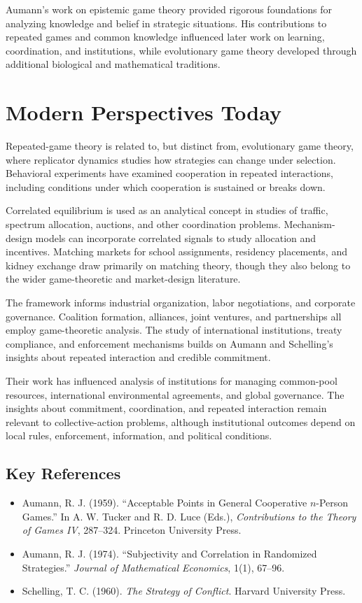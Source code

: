 Aumann's work on epistemic game theory provided rigorous foundations for
analyzing knowledge and belief in strategic situations. His contributions to
repeated games and common knowledge influenced later work on learning,
coordination, and institutions, while evolutionary game theory developed through
additional biological and mathematical traditions.

\section{Modern Perspectives Today}
Repeated-game theory is related to, but distinct from, evolutionary game theory,
where replicator dynamics studies how strategies can change under selection.
Behavioral experiments have examined cooperation in repeated interactions,
including conditions under which cooperation is sustained or breaks down.

Correlated equilibrium is used as an analytical concept in studies of traffic,
spectrum allocation, auctions, and other coordination problems. Mechanism-design
models can incorporate correlated signals to study allocation and incentives.
Matching markets for school assignments, residency placements, and kidney
exchange draw primarily on matching theory, though they also belong to the wider
game-theoretic and market-design literature.

The framework informs industrial organization, labor negotiations, and
corporate governance. Coalition formation, alliances, joint ventures, and
partnerships all employ game-theoretic analysis. The study of international
institutions, treaty compliance, and enforcement mechanisms builds on Aumann
and Schelling's insights about repeated interaction and credible commitment.

Their work has influenced analysis of institutions for managing common-pool
resources, international environmental agreements, and global governance. The
insights about commitment, coordination, and repeated interaction remain relevant
to collective-action problems, although institutional outcomes depend on local
rules, enforcement, information, and political conditions.

\subsection*{Key References}
\begin{itemize}
    \item Aumann, R. J. (1959). ``Acceptable Points in General Cooperative $n$-Person Games.'' In A. W. Tucker and R. D. Luce (Eds.), \textit{Contributions to the Theory of Games IV}, 287--324. Princeton University Press.
    \item Aumann, R. J. (1974). ``Subjectivity and Correlation in Randomized Strategies.'' \textit{Journal of Mathematical Economics}, 1(1), 67--96.
    \item Schelling, T. C. (1960). \textit{The Strategy of Conflict}. Harvard University Press.
\end{itemize}
